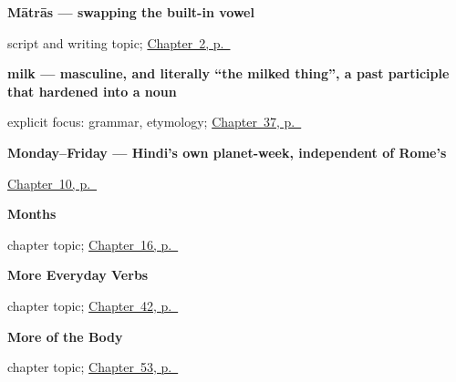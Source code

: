 \noindent\begin{minipage}[t]{\linewidth}
\raggedright
\textbf{Mātrās — swapping the built-in vowel}\par
\footnotesize script and writing topic; \hyperref[ch:introductions]{Chapter~2, p.~\pageref*{ch:introductions}}
\end{minipage}\par\smallskip

\noindent\begin{minipage}[t]{\linewidth}
\raggedright
\textbf{milk — masculine, and literally \textquotedblleft{}the milked thing\textquotedblright{}, a past participle that hardened into a noun}\enspace\emph{}\par
\footnotesize explicit focus: grammar, etymology; \hyperref[ch:hi-one-tea-please]{Chapter~37, p.~\pageref*{ch:hi-one-tea-please}}
\end{minipage}\par\smallskip

\noindent\begin{minipage}[t]{\linewidth}
\raggedright
\textbf{Monday–Friday — Hindi's own planet-week, independent of Rome's}\enspace\emph{    }\par
\footnotesize \hyperref[ch:hi-days-of-the-week]{Chapter~10, p.~\pageref*{ch:hi-days-of-the-week}}
\end{minipage}\par\smallskip

\noindent\begin{minipage}[t]{\linewidth}
\raggedright
\textbf{Months}\par
\footnotesize chapter topic; \hyperref[ch:hi-months]{Chapter~16, p.~\pageref*{ch:hi-months}}
\end{minipage}\par\smallskip

\noindent\begin{minipage}[t]{\linewidth}
\raggedright
\textbf{More Everyday Verbs}\par
\footnotesize chapter topic; \hyperref[ch:hi-more-verbs]{Chapter~42, p.~\pageref*{ch:hi-more-verbs}}
\end{minipage}\par\smallskip

\noindent\begin{minipage}[t]{\linewidth}
\raggedright
\textbf{More of the Body}\par
\footnotesize chapter topic; \hyperref[ch:hi-more-of-the-body]{Chapter~53, p.~\pageref*{ch:hi-more-of-the-body}}
\end{minipage}\par\smallskip

